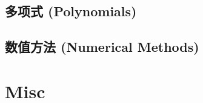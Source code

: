 \documentclass[a4paper]{article}
\begin{document}





\subsection{多项式 (Polynomials)}


\subsection{数值方法 (Numerical Methods)}


\section{Misc}





\end{document}
